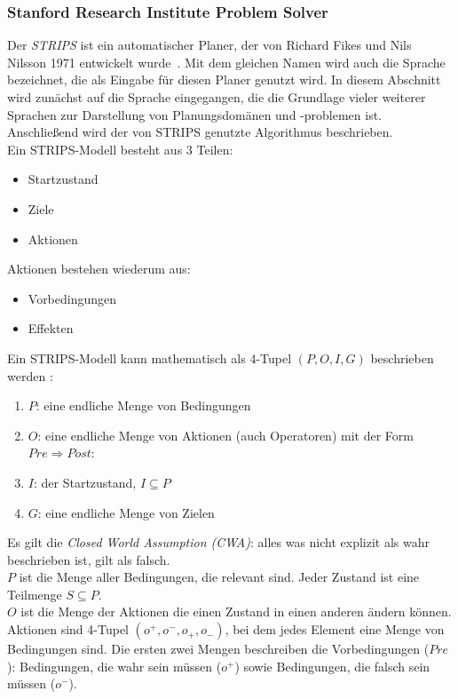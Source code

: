 \subsubsection{Stanford Research Institute Problem Solver}{\label{chap:strips}}
Der \emph{\ac{STRIPS}} ist ein automatischer Planer, der von Richard Fikes und Nils Nilsson 1971 entwickelt wurde~\cite{FIKES1971189}.
Mit dem gleichen Namen wird auch die Sprache bezeichnet, die als Eingabe für diesen Planer genutzt wird.
In diesem Abschnitt wird zunächst auf die Sprache eingegangen, die die Grundlage vieler weiterer Sprachen zur Darstellung von Planungsdomänen und -problemen ist.
Anschließend wird der von \ac{STRIPS} genutzte Algorithmus beschrieben.\\
Ein \ac{STRIPS}-Modell besteht aus 3 Teilen:
\begin{itemize}
    \item Startzustand
    \item Ziele
    \item Aktionen
\end{itemize}
Aktionen bestehen wiederum aus:
\begin{itemize}
    \item Vorbedingungen
    \item Effekten
\end{itemize}
Ein \ac{STRIPS}-Modell kann mathematisch als 4-Tupel \((P,O,I,G)\) beschrieben werden \cite{stripsdef}:
\begin{enumerate}
    \item \(P\): eine endliche Menge von Bedingungen
    \item \(O\): eine endliche Menge von Aktionen (auch Operatoren) mit der Form $Pre \Rightarrow Post$:
    \item \(I\): der Startzustand, $I\subseteq P$
    \item \(G\): eine endliche Menge von Zielen
\end{enumerate}
Es gilt die \emph{Closed World Assumption (CWA)}: alles was nicht explizit als wahr beschrieben ist, gilt als falsch.\\
$P$ ist die Menge aller Bedingungen, die relevant sind.
Jeder Zustand ist eine Teilmenge $S\subseteq P$.\\
$O$ ist die Menge der Aktionen die einen Zustand in einen anderen ändern können.
Aktionen sind 4-Tupel \((o^+,o^-,o_+,o_-)\), bei dem jedes Element eine Menge von Bedingungen sind.
Die ersten zwei Mengen beschreiben die Vorbedingungen ($Pre$): Bedingungen, die wahr sein müssen ($o^+$) sowie Bedingungen, die falsch sein müssen ($o^-$).
